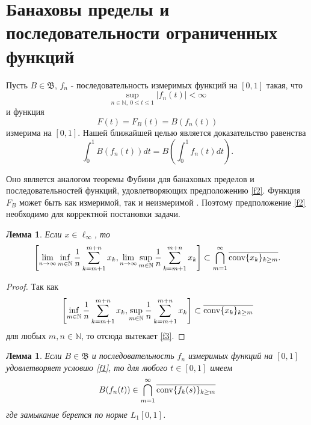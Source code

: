 \documentclass[12pt]{article}
\newtheorem{lem}[thm]{Лемма}
\def\N{{\mathbb{N}}}
\def\B{{\mathfrak{B}}}
\begin{document}
\section{Банаховы пределы и последовательности ограниченных функций}\label{sec:Fubini}

Пусть $B\in \B$, $f_n$ - последовательность измеримых функций на $[0,1]$ такая, что
\begin{equation}\label{f1}
\sup_{n\in\N, \ 0\le t\le 1} |f_n(t)|<\infty
\end{equation}
и функция
\begin{equation}\label{f2}
F(t)=F_B(t)=B(f_n(t))
 \end{equation}
 измерима на $[0,1]$. Нашей ближайшей целью является доказательство равенства
\begin{equation}\label{Fubini}
\int_0^1 B(f_n(t)) dt = B\left(\int_0^1 f_n(t) dt\right).
 \end{equation}

 Оно является аналогом теоремы Фубини для банаховых пределов и последовательностей функций, удовлетворяющих предположению \eqref{f2}. Функция $F_B$ может быть как измеримой, так и неизмеримой \cite{SS, FT}. Поэтому предположение \eqref{f2} необходимо для корректной постановки задачи.

 \begin{lem}\label{l1}
 Если $x\in\ell_\infty$, то
 \begin{equation}\label{f3}
 \left[\lim_{n\to\infty} \inf_{m\in\N} \frac1n \sum_{k=m+1}^{m+n} x_k, \lim_{n\to\infty} \sup_{m\in\N} \frac1n \sum_{k=m+1}^{m+n} x_k \right] \subset \bigcap_{m=1}^\infty \overline{{\rm conv} \{x_k\}_{k\ge m}}.
 \end{equation}
 \end{lem}

 \begin{proof}
 Так как
 $$\left[\inf_{m\in\N} \frac1n \sum_{k=m+1}^{m+n} x_k, \sup_{m\in\N} \frac1n \sum_{k=m+1}^{m+n} x_k \right] \subset \overline{{\rm conv} \{x_k\}_{k\ge m}} $$
 для любых $m,n\in\N$, то отсюда вытекает \eqref{f3}.
 \end{proof}

  \begin{lem}\label{l2}
 Если $B\in \B$ и последовательность $f_n$  измеримых функций на $[0,1]$ удовлетворяет условию \eqref{f1}, то для любого $t\in[0,1]$ имеем
 \begin{equation}
B(f_n(t)) \in \bigcap_{m=1}^\infty \overline{{\rm conv} \{f_k(s)\}_{k\ge m}}
 \end{equation}
 где замыкание берется по норме $L_1[0,1]$.
 \end{lem}
\end{document}

